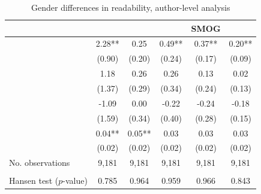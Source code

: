 \begin{table}
    \footnotesize
    \centering
    \begin{threeparttable}
        \caption{Gender differences in readability, author-level analysis}
        \label{table4_FemRatio}
        \begin{tabular}{p{4cm}S@{}S@{}S@{}S@{}S@{}}
            \toprule
            &{}&{}&{}&{SMOG}&{}\\
            \midrule
            &        2.28** &        0.25   &        0.49** &        0.37** &        0.20** \\
                                          &      {(0.90)}   &      {(0.20)}   &      {(0.24)}   &      {(0.17)}   &      {(0.09)}   \\
            &        1.18   &        0.26   &        0.26   &        0.13   &        0.02   \\
                                          &      {(1.37)}   &      {(0.29)}   &      {(0.34)}   &      {(0.24)}   &      {(0.13)}   \\
            &       -1.09   &        0.00   &       -0.22   &       -0.24   &       -0.18   \\
                                          &      {(1.59)}   &      {(0.34)}   &      {(0.40)}   &      {(0.28)}   &      {(0.15)}   \\
            &        0.04** &        0.05** &        0.03   &        0.03   &        0.03   \\
                                          &      {(0.02)}   &      {(0.02)}   &      {(0.02)}   &      {(0.02)}   &      {(0.02)}   \\
            \midrule
            No. observations      &       9,181   &       9,181   &       9,181   &       9,181   &       9,181   \\
             \\\quad Hansen test (\(p\)-value)&       0.785   &       0.964   &       0.959   &       0.966   &       0.843   \\

\end{tabular}
\end{threeparttable}
\end{table}
